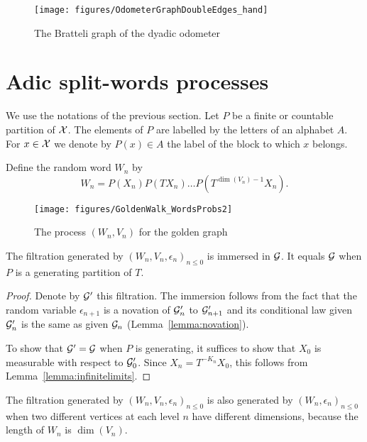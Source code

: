 \documentclass[12pt,a4paper]{article}
\begin{document}
\begin{figure}[!h]
\centering
	\texttt{[image: figures/OdometerGraphDoubleEdges\_hand]}
\caption{The Bratteli graph of the dyadic odometer}
\label{fig:graphodometer}
\end{figure}




\section{Adic split-words processes}\label{sec:adicsplitwords}

We use the notations of the previous section. 
Let $P$ be a finite or countable partition of $\mathcal{X}$. 
The elements of $P$ are labelled by the letters of an alphabet $A$. 
For $x \in \mathcal{X}$ we denote by $P(x) \in A$ the label of the block to which $x$ belongs.

Define the random word $W_n$ by 
$$
W_n = P(X_n)P(TX_n)\ldots P(T^{\dim(V_n)-1}X_n).
$$

\begin{figure}[!h]
\centering
	\texttt{[image: figures/GoldenWalk\_WordsProbs2]}
\caption{The process $(W_n, V_n)$ for the golden graph}
\end{figure}

\begin{lemma}
The filtration generated by ${(W_n,V_n,\epsilon_n)}_{n \leq 0}$  
is immersed in $\mathcal{G}$. 
It equals $\mathcal{G}$ when $P$ is a generating partition of $T$.
\end{lemma}

\begin{proof}
Denote by $\mathcal{G}'$ this filtration. The immersion follows from the fact 
that the random variable $\epsilon_{n+1}$ is 
a novation of $\mathcal{G}'_n$ to $\mathcal{G}'_{n+1}$ and its conditional law given 
$\mathcal{G}'_n$ is the same as given $\mathcal{G}_n$ (Lemma~\ref{lemma:novation}).

To show that $\mathcal{G}'=\mathcal{G}$ when $P$ is generating, it suffices to show 
that $X_0$ is measurable with respect to $\mathcal{G}'_0$. 
Since $X_n=T^{-K_n}X_0$, this follows from Lemma~\ref{lemma:infinitelimits}. 
\end{proof}

The filtration generated by ${(W_n,V_n,\epsilon_n)}_{n \leq 0}$ 
is also generated by ${(W_n,\epsilon_n)}_{n \leq 0}$ when 
two different vertices at each level $n$ have different dimensions, 
because the length of $W_n$ is $\dim(V_n)$. 
\end{document}
